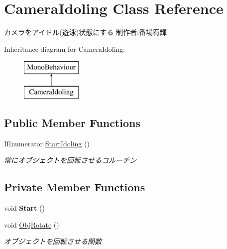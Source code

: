 \hypertarget{class_camera_idoling}{}\section{Camera\+Idoling Class Reference}
\label{class_camera_idoling}


カメラをアイドル(遊泳)状態にする 制作者\+:番場宥輝  


Inheritance diagram for Camera\+Idoling\+:\begin{figure}[H]
\begin{center}
\leavevmode
\includegraphics[height=2.000000cm]{class_camera_idoling}
\end{center}
\end{figure}
\subsection*{Public Member Functions}
\begin{DoxyCompactItemize}
\item 
I\+Enumerator \hyperlink{class_camera_idoling_ad2377166d119d4397a2680df6e521b02}{Start\+Idoling} ()
\begin{DoxyCompactList}\small\item\em 常にオブジェクトを回転させるコルーチン \end{DoxyCompactList}\end{DoxyCompactItemize}
\subsection*{Private Member Functions}
\begin{DoxyCompactItemize}
\item 
\mbox{\label{class_camera_idoling_ad8e5a941a77f50e3afe378924b48a340}} 
void {\bfseries Start} ()
\item 
void \hyperlink{class_camera_idoling_aea64e8d32b33d224b377365c89ebd7f8}{Obj\+Rotate} ()
\begin{DoxyCompactList}\small\item\em オブジェクトを回転させる関数 \end{DoxyCompactList}\end{DoxyCompactItemize}
